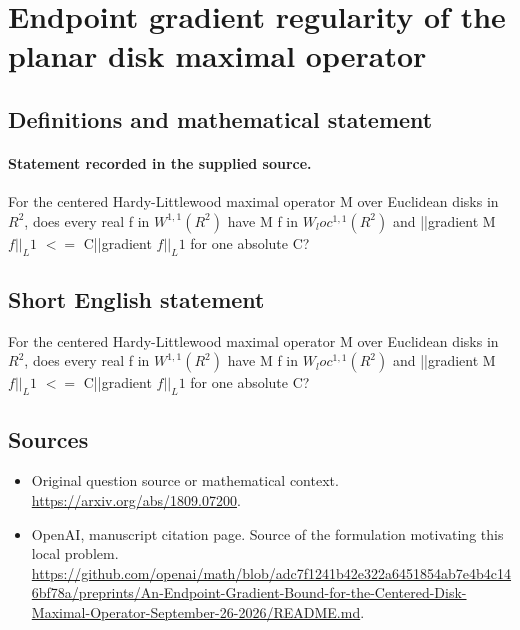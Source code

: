 \documentclass[11pt]{article}
\begin{document}
\section*{Endpoint gradient regularity of the planar disk maximal operator}\label{30007423}
\subsection{Definitions and mathematical statement}
\paragraph{Statement recorded in the supplied source.}
For the centered Hardy-Littlewood maximal operator M over Euclidean disks in $R^2$, does every real f in $W^{1,1}(R^2)$ have M f in $W_loc^{1,1}(R^2)$ and ||gradient M $f||_L1$ $<=$ C||gradient $f||_L1$ for one absolute C?
\subsection{Short English statement}
For the centered Hardy-Littlewood maximal operator M over Euclidean disks in $R^2$, does every real f in $W^{1,1}(R^2)$ have M f in $W_loc^{1,1}(R^2)$ and ||gradient M $f||_L1$ $<=$ C||gradient $f||_L1$ for one absolute C?
\subsection{Sources}
\begin{itemize}
\item[S1] Original question source or mathematical context.
\url{https://arxiv.org/abs/1809.07200}.
\item[S2] OpenAI, manuscript citation page. Source of the formulation motivating this local problem.
\url{https://github.com/openai/math/blob/adc7f1241b42e322a6451854ab7e4b4c146bf78a/preprints/An-Endpoint-Gradient-Bound-for-the-Centered-Disk-Maximal-Operator-September-26-2026/README.md}.
\end{itemize}
\end{document}
